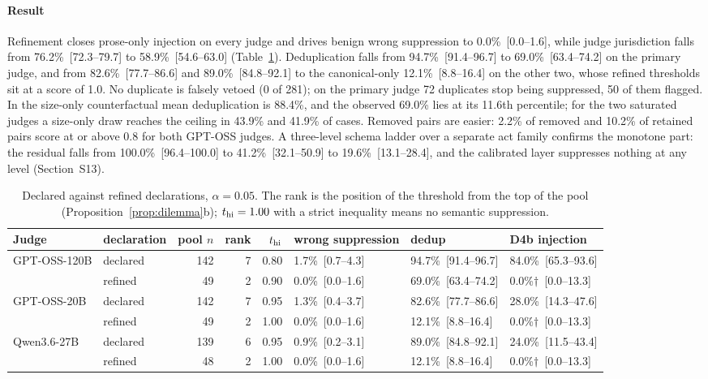 \paragraph{Result} Refinement closes prose-only injection on every judge and drives benign wrong suppression to 0.0\%~[0.0--1.6], while judge jurisdiction falls from 76.2\%~[72.3--79.7] to 58.9\%~[54.6--63.0] (Table~\ref{tab:refinement}). Deduplication falls from 94.7\%~[91.4--96.7] to 69.0\%~[63.4--74.2] on the primary judge, and from 82.6\%~[77.7--86.6] and 89.0\%~[84.8--92.1] to the canonical-only 12.1\%~[8.8--16.4] on the other two, whose refined thresholds sit at a score of 1.0. No duplicate is falsely vetoed (0 of 281); on the primary judge 72 duplicates stop being suppressed, 50 of them flagged. In the size-only counterfactual mean deduplication is 88.4\%, and the observed 69.0\% lies at its 11.6th percentile; for the two saturated judges a size-only draw reaches the ceiling in 43.9\% and 41.9\% of cases. Removed pairs are easier: 2.2\% of removed and 10.2\% of retained pairs score at or above 0.8 for both GPT-OSS judges. A three-level schema ladder over a separate act family confirms the monotone part: the residual falls from 100.0\%~[96.4--100.0] to 41.2\%~[32.1--50.9] to 19.6\%~[13.1--28.4], and the calibrated layer suppresses nothing at any level (Section~S13).

\begin{table}[!tbp]
\centering\scriptsize\setlength{\tabcolsep}{2.2pt}
\caption{Declared against refined declarations, $\alpha=0.05$. The rank is the position of the threshold from the top of the pool (Proposition~\ref{prop:dilemma}b); $t_{\mathrm{hi}}=1.00$ with a strict inequality means no semantic suppression.}\label{tab:refinement}
\begin{tabular}{@{}llrrrlll@{}}
\toprule
Judge & declaration & pool $n$ & rank & $t_{\mathrm{hi}}$ & wrong suppression & dedup & D4b injection \\
\midrule
GPT-OSS-120B & declared & 142 & 7 & 0.80 & 1.7\%~[0.7--4.3] & 94.7\%~[91.4--96.7] & 84.0\%~[65.3--93.6] \\
 & refined & 49 & 2 & 0.90 & 0.0\%~[0.0--1.6] & 69.0\%~[63.4--74.2] & 0.0\%$\dagger$~[0.0--13.3] \\
GPT-OSS-20B & declared & 142 & 7 & 0.95 & 1.3\%~[0.4--3.7] & 82.6\%~[77.7--86.6] & 28.0\%~[14.3--47.6] \\
 & refined & 49 & 2 & 1.00 & 0.0\%~[0.0--1.6] & 12.1\%~[8.8--16.4] & 0.0\%$\dagger$~[0.0--13.3] \\
Qwen3.6-27B & declared & 139 & 6 & 0.95 & 0.9\%~[0.2--3.1] & 89.0\%~[84.8--92.1] & 24.0\%~[11.5--43.4] \\
 & refined & 48 & 2 & 1.00 & 0.0\%~[0.0--1.6] & 12.1\%~[8.8--16.4] & 0.0\%$\dagger$~[0.0--13.3] \\
\bottomrule
\end{tabular}
\end{table}

